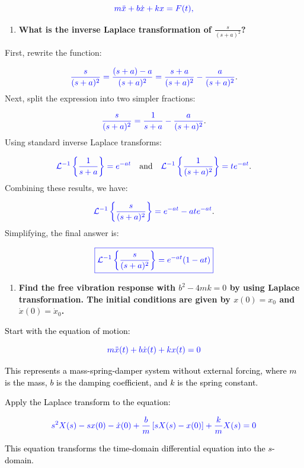 \documentclass[12pt]{article}
\begin{document}
\[
	\textcolor{blue}{m\ddot{x} + b\dot{x} + kx = F(t),}
\]
\begin{enumerate}   
	\item[(b)] \textbf{What is the inverse Laplace transformation of $\frac{s}{(s+a)^2}$?}
\end{enumerate}
First, rewrite the function:
	      
\[
	\textcolor{blue}{\frac{s}{(s + a)^2} = \frac{(s + a) - a}{(s + a)^2} = \frac{s + a}{(s + a)^2} - \frac{a}{(s + a)^2}}.
\]
Next, split the expression into two simpler fractions:
	      
\[
	\textcolor{blue}{\frac{s}{(s + a)^2} = \frac{1}{s + a} - \frac{a}{(s + a)^2}}.
\]
Using standard inverse Laplace transforms:
	      
\[
	\textcolor{blue}{\mathcal{L}^{-1}\left\{\frac{1}{s + a}\right\} = e^{-at}} \quad \text{and} \quad \textcolor{blue}{\mathcal{L}^{-1}\left\{\frac{1}{(s + a)^2}\right\} = t e^{-at}}.
\]
Combining these results, we have:
	      
\[
	\textcolor{blue}{\mathcal{L}^{-1}\left\{\frac{s}{(s + a)^2}\right\} = e^{-at} - a t e^{-at}}.
\]
Simplifying, the final answer is:
	      
\[
	\textcolor{blue}{\boxed{\mathcal{L}^{-1}\left\{\frac{s}{(s + a)^2}\right\} = e^{-at} (1 - at)}}
\]
\newpage
\begin{enumerate}
	\item[(c)] \textbf{Find the free vibration response with $b^2 - 4mk = 0$ by using Laplace transformation. The initial conditions are given by $x(0) = x_0$ and $\dot{x}(0) = \dot{x}_0$.}
	      	      
\end{enumerate}
	      
\noindent
\textcolor{black}{Start with the equation of motion:}

\[
	\textcolor{blue}{m\ddot{x}(t) + b\dot{x}(t) + kx(t) = 0}
\]

\noindent
\textcolor{black}{This represents a mass-spring-damper system without external forcing, where \( m \) is the mass, \( b \) is the damping coefficient, and \( k \) is the spring constant.}

\noindent
\textcolor{black}{Apply the Laplace transform to the equation:}

\[
	\textcolor{blue}{s^2X(s) - sx(0) - \dot{x}(0) + \frac{b}{m} \left[sX(s) - x(0)\right] + \frac{k}{m}X(s) = 0}
\]

\noindent
\textcolor{black}{This equation transforms the time-domain differential equation into the \( s \)-domain.}
\end{document}
